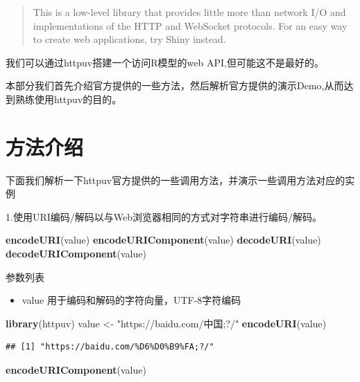 \documentclass[]{book}
\newenvironment{Shaded}{\begin{snugshade}}{\end{snugshade}}
\newcommand{\KeywordTok}[1]{\textcolor[rgb]{0.13,0.29,0.53}{\textbf{#1}}}
\newcommand{\StringTok}[1]{\textcolor[rgb]{0.31,0.60,0.02}{#1}}
\newcommand{\NormalTok}[1]{#1}
\providecommand{\tightlist}{%
  \setlength{\itemsep}{0pt}\setlength{\parskip}{0pt}}
\begin{document}
\begin{quote}
This is a low-level library that provides little more than network I/O
and implementations of the HTTP and WebSocket protocols. For an easy way
to create web applications, try Shiny instead.
\end{quote}

我们可以通过httpuv搭建一个访问R模型的web API,但可能这不是最好的。

本部分我们首先介绍官方提供的一些方法，然后解析官方提供的演示Demo,从而达到熟练使用httpuv的目的。

\section{方法介绍}

下面我们解析一下httpuv官方提供的一些调用方法，并演示一些调用方法对应的实例

1.使用URI编码/解码以与Web浏览器相同的方式对字符串进行编码/解码。

\begin{Shaded}
\begin{Highlighting}[]
\KeywordTok{encodeURI}\NormalTok{(value)}
\KeywordTok{encodeURIComponent}\NormalTok{(value)}
\KeywordTok{decodeURI}\NormalTok{(value)}
\KeywordTok{decodeURIComponent}\NormalTok{(value)}
\end{Highlighting}
\end{Shaded}

参数列表

\begin{itemize}
\tightlist
\item
  value 用于编码和解码的字符向量，UTF-8字符编码
\end{itemize}

\begin{Shaded}
\begin{Highlighting}[]
\KeywordTok{library}\NormalTok{(httpuv)}
\NormalTok{value <-}\StringTok{ "https://baidu.com/中国;?/"}
\KeywordTok{encodeURI}\NormalTok{(value)}
\end{Highlighting}
\end{Shaded}

\begin{verbatim}
## [1] "https://baidu.com/%D6%D0%B9%FA;?/"
\end{verbatim}

\begin{Shaded}
\begin{Highlighting}[]
\KeywordTok{encodeURIComponent}\NormalTok{(value)}
\end{Highlighting}
\end{Shaded}
\end{document}
